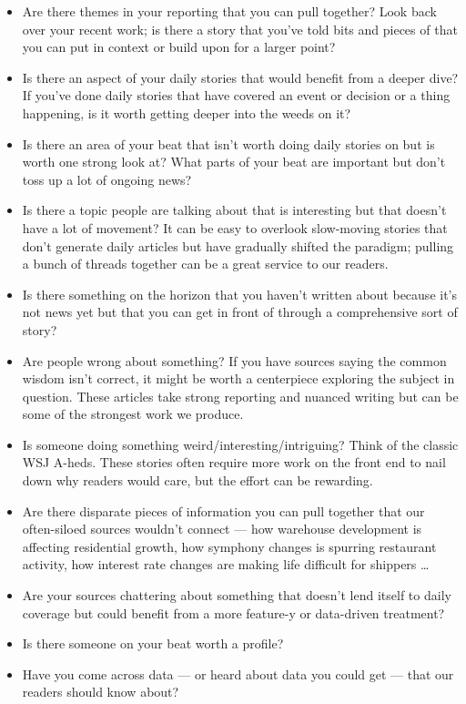 \documentclass[
  11pt,
  american,
  letterpaperpaper,
  extrafontsizes,onecolumn,openright
  ]{memoir}
\providecommand{\tightlist}{%
  \setlength{\itemsep}{0pt}\setlength{\parskip}{0pt}}
\begin{document}
\begin{itemize}
\tightlist
\item
  Are there themes in your reporting that you can pull together? Look back over your recent work; is there a story that you've told bits and pieces of that you can put in context or build upon for a larger point?
\item
  Is there an aspect of your daily stories that would benefit from a deeper dive? If you've done daily stories that have covered an event or decision or a thing happening, is it worth getting deeper into the weeds on it?
\item
  Is there an area of your beat that isn't worth doing daily stories on but is worth one strong look at? What parts of your beat are important but don't toss up a lot of ongoing news?
\item
  Is there a topic people are talking about that is interesting but that doesn't have a lot of movement? It can be easy to overlook slow-moving stories that don't generate daily articles but have gradually shifted the paradigm; pulling a bunch of threads together can be a great service to our readers.
\item
  Is there something on the horizon that you haven't written about because it's not news yet but that you can get in front of through a comprehensive sort of story?
\item
  Are people wrong about something? If you have sources saying the common wisdom isn't correct, it might be worth a centerpiece exploring the subject in question. These articles take strong reporting and nuanced writing but can be some of the strongest work we produce.
\item
  Is someone doing something weird/interesting/intriguing? Think of the classic WSJ A-heds. These stories often require more work on the front end to nail down why readers would care, but the effort can be rewarding.
\item
  Are there disparate pieces of information you can pull together that our often-siloed sources wouldn't connect --- how warehouse development is affecting residential growth, how symphony changes is spurring restaurant activity, how interest rate changes are making life difficult for shippers \ldots{}
\item
  Are your sources chattering about something that doesn't lend itself to daily coverage but could benefit from a more feature-y or data-driven treatment?
\item
  Is there someone on your beat worth a profile?
\item
  Have you come across data --- or heard about data you could get --- that our readers should know about?
\end{itemize}
\end{document}
